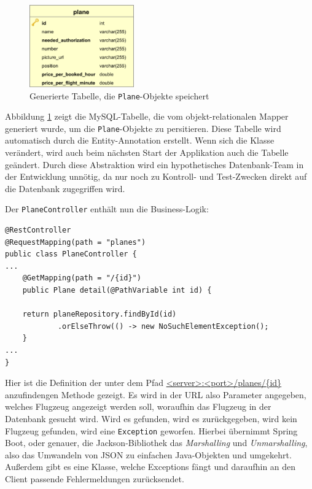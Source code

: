 \documentclass[a4paper, 11pt]{article}
\begin{document}
\begin{figure}[htpb]
    \centering
    \includegraphics[width=0.4\textwidth]{images/erm/plane.png}
    \caption{Generierte Tabelle, die \texttt{Plane}-Objekte speichert}
    \label{fig:plane_table}
\end{figure}

Abbildung \ref{fig:plane_table} zeigt die MySQL-Tabelle, die vom
objekt-relationalen Mapper generiert wurde, um die \texttt{Plane}-Objekte zu
persitieren. Diese Tabelle wird automatisch durch die Entity-Annotation
erstellt. Wenn sich die Klasse verändert, wird auch beim nächsten Start der
Applikation auch die Tabelle geändert. Durch diese Abstraktion wird ein
hypothetisches Datenbank-Team in der Entwicklung unnötig, da nur noch zu
Kontroll- und Test-Zwecken direkt auf die Datenbank zugegriffen wird.

Der \texttt{PlaneController} enthält nun die Business-Logik:

\begin{lstlisting}
@RestController
@RequestMapping(path = "planes")
public class PlaneController {
...
    @GetMapping(path = "/{id}")
    public Plane detail(@PathVariable int id) {

    return planeRepository.findById(id)
            .orElseThrow(() -> new NoSuchElementException();
    }
...
}
\end{lstlisting}

Hier ist die Definition der unter dem Pfad \url{<server>:<port>/planes/{id}}
anzufindengen Methode gezeigt. Es wird in der URL also Parameter angegeben,
welches Flugzeug angezeigt werden soll, woraufhin das Flugzeug in der Datenbank
gesucht wird. Wird es gefunden, wird es zurückgegeben, wird kein Flugzeug
gefunden, wird eine \lstinline{Exception} geworfen. Hierbei übernimmt Spring
Boot, oder genauer, die Jackson-Bibliothek das \emph{Marshalling} und
\emph{Unmarshalling}, also das Umwandeln von JSON zu einfachen Java-Objekten
und umgekehrt. Außerdem gibt es eine Klasse, welche Exceptions fängt und
daraufhin an den Client passende Fehlermeldungen zurücksendet.
\end{document}
